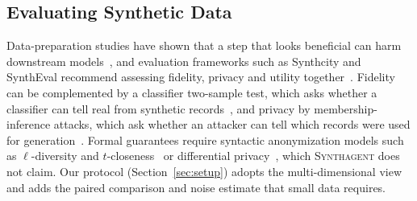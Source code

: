 \documentclass[conference]{IEEEtran}
\newcommand{\system}{\textsc{Synthagent}\xspace}
\begin{document}
\subsection{Evaluating Synthetic Data}
Data-preparation studies have shown that a step that looks beneficial can harm downstream models~\cite{li2021cleanml,guha2023cleaningfairness}, and evaluation frameworks such as Synthcity and SynthEval recommend assessing fidelity, privacy and utility together~\cite{qian2023synthcity,lautrup2025syntheval}. Fidelity can be complemented by a classifier two-sample test, which asks whether a classifier can tell real from synthetic records~\cite{lopezpaz2017c2st}, and privacy by membership-inference attacks, which ask whether an attacker can tell which records were used for generation~\cite{shokri2017mia,hyeong2022tabularmia}. Formal guarantees require syntactic anonymization models such as $\ell$-diversity and $t$-closeness~\cite{machanavajjhala2006ldiversity,li2007tcloseness} or differential privacy~\cite{dwork2014dp}, which \system does not claim. Our protocol (Section~\ref{sec:setup}) adopts the multi-dimensional view and adds the paired comparison and noise estimate that small data requires.

\end{document}
